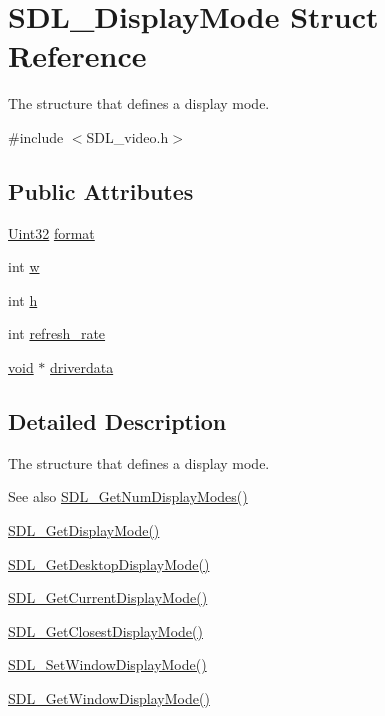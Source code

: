 \hypertarget{struct_s_d_l___display_mode}{}\section{S\+D\+L\+\_\+\+Display\+Mode Struct Reference}
\label{struct_s_d_l___display_mode}


The structure that defines a display mode.  




{\ttfamily \#include $<$S\+D\+L\+\_\+video.\+h$>$}

\subsection*{Public Attributes}
\begin{DoxyCompactItemize}
\item 
\mbox{\hyperlink{_s_d_l__stdinc_8h_add440eff171ea5f55cb00c4a9ab8672d}{Uint32}} \mbox{\hyperlink{struct_s_d_l___display_mode_ae8120e0a18a99992f039756e1b503680}{format}}
\item 
int \mbox{\hyperlink{struct_s_d_l___display_mode_a504bb5e21950b719a0df43be51199046}{w}}
\item 
int \mbox{\hyperlink{struct_s_d_l___display_mode_a0d9eabed50a560ed553af772c26632d7}{h}}
\item 
int \mbox{\hyperlink{struct_s_d_l___display_mode_ad1b5783c9b292ebf24ad4e0e7a98e540}{refresh\+\_\+rate}}
\item 
\mbox{\hyperlink{_s_d_l__opengles2__gl2ext_8h_ae5d8fa23ad07c48bb609509eae494c95}{void}} $\ast$ \mbox{\hyperlink{struct_s_d_l___display_mode_a411f93025411da873f37a384ae62bbcf}{driverdata}}
\end{DoxyCompactItemize}


\subsection{Detailed Description}
The structure that defines a display mode. 

\begin{DoxySeeAlso}{See also}
\mbox{\hyperlink{_s_d_l__video_8h_a5abcf18592f00019c517e791f8ba53fc}{S\+D\+L\+\_\+\+Get\+Num\+Display\+Modes()}} 

\mbox{\hyperlink{_s_d_l__video_8h_a0a53e003ec6ad24dd2bbbcd0ad297311}{S\+D\+L\+\_\+\+Get\+Display\+Mode()}} 

\mbox{\hyperlink{_s_d_l__video_8h_ab97bca68fc068a6ecc3db473c4c0defd}{S\+D\+L\+\_\+\+Get\+Desktop\+Display\+Mode()}} 

\mbox{\hyperlink{_s_d_l__video_8h_a14dce1cb33085b36f08d27b3d8f2335b}{S\+D\+L\+\_\+\+Get\+Current\+Display\+Mode()}} 

\mbox{\hyperlink{_s_d_l__video_8h_a794be92ee0a9efca226fa19a635fa470}{S\+D\+L\+\_\+\+Get\+Closest\+Display\+Mode()}} 

\mbox{\hyperlink{_s_d_l__video_8h_a2ca17d1e857d1560738e002c9935088a}{S\+D\+L\+\_\+\+Set\+Window\+Display\+Mode()}} 

\mbox{\hyperlink{_s_d_l__video_8h_a8185547bc7cb0bbeb400f459792d081a}{S\+D\+L\+\_\+\+Get\+Window\+Display\+Mode()}} 
\end{DoxySeeAlso}


